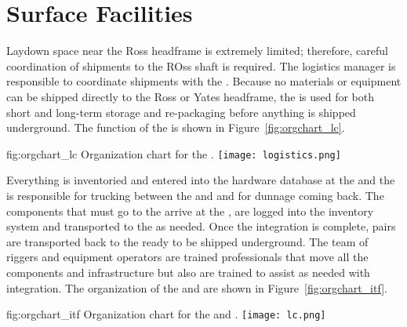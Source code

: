 \section{Surface Facilities}

Laydown space near the Ross headframe is extremely limited; therefore,
careful coordination of shipments to the ROss shaft is required. The
 logistics manager is responsible to coordinate shipments
with the .  Because no materials or equipment can be
shipped directly to the Ross or Yates headframe, the  is
used for both short and long-term storage and re-packaging before
anything is shipped underground.  The function of the  is
shown in Figure~\ref{fig:orgchart_lc}.
\begin{dunefigure}{fig:orgchart_lc}
  {Organization chart for the .}
  \texttt{[image: logistics.png]}
\end{dunefigure}
Everything is inventoried and entered into the hardware database at
the  and the  is responsible for trucking between
the  and \surf and for dunnage coming back. The 
components that must go to
the  arrive at the , are logged into the
inventory system and transported to the  as
needed. Once the integration is complete,  pairs are
transported back to the  ready to be shipped underground.
The team of riggers and equipment operators are trained professionals
that move all the  components and infrastructure but also
are trained to assist as needed with integration. The organization of
the  and  are shown in
Figure~\ref{fig:orgchart_itf}.
\begin{dunefigure}{fig:orgchart_itf}
  {Organization chart for the  and .}
  \texttt{[image: lc.png]}
\end{dunefigure}

\subsection{}


